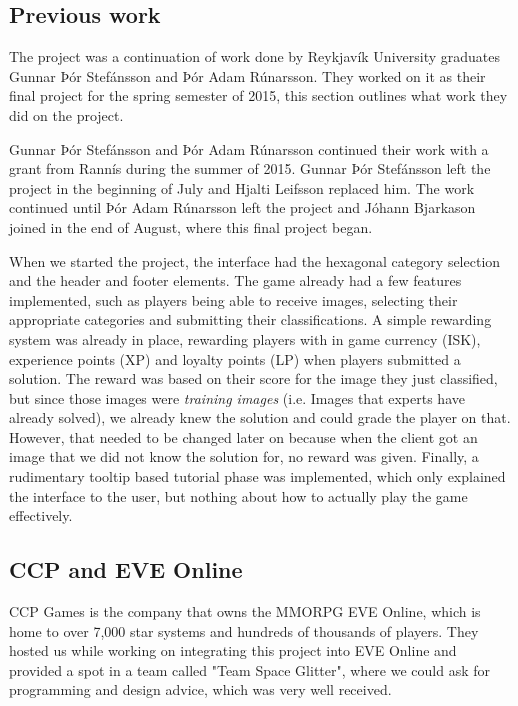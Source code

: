 
\subsection{Previous work}
	The project was a continuation of work done by Reykjavík University graduates Gunnar Þór Stefánsson and Þór Adam Rúnarsson. They worked on it as their final project for the spring semester of 2015, this section outlines what work they did on the project. 

	Gunnar Þór Stefánsson and Þór Adam Rúnarsson continued their work with a grant from Rannís during the summer of 2015. Gunnar Þór Stefánsson left the project in the beginning of July and Hjalti Leifsson replaced him. The work continued until Þór Adam Rúnarsson left the project and Jóhann Bjarkason joined in the end of August, where this final project began.

	When we started the project, the interface had the hexagonal category selection and the header and footer elements. The game already had a few features implemented, such as players being able to receive images, selecting their appropriate categories and submitting their classifications.
	A simple rewarding system was already in place, rewarding players with in game currency (ISK), experience points (XP) and loyalty points (LP) when players submitted a solution. The reward was based on their score for the image they just classified, but since those images were \emph{training images} (i.e. Images that experts have already solved), we already knew the solution and could grade the player on that. However, that needed to be changed later on because when the client got an image that we did not know the solution for, no reward was given.
	Finally, a rudimentary tooltip based tutorial phase was implemented, which only explained the interface to the user, but nothing about how to actually play the game effectively.

\subsection{CCP and EVE Online}
	CCP Games is the company that owns the MMORPG EVE Online, which is home to over 7,000 star systems and hundreds of thousands of players. They hosted us while working on integrating this project into EVE Online and provided a spot in a team called "Team Space Glitter", where we could ask for programming and design advice, which was very well received.

